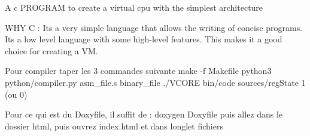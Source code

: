 A c PROGRAM to create a virtual cpu with the simplest architecture

WHY C \+: It\textquotesingle{}s a very simple language that allows the writing of concise programs. It\textquotesingle{}s a low level language with some high-\/level features. This makes it a good choice for creating a VM.

Pour compiler taper les 3 commandes suivante make -\/f Makefile python3 python/compiler.\+py asm\+\_\+file.\+s binary\+\_\+file ./\+VCORE bin/code sources/reg\+State 1 (ou 0)

Pour ce qui est du Doxyfile, il suffit de \+: doxygen Doxyfile puis allez dans le dossier html, puis ouvrez index.\+html et dans l\textquotesingle{}onglet fichiers 